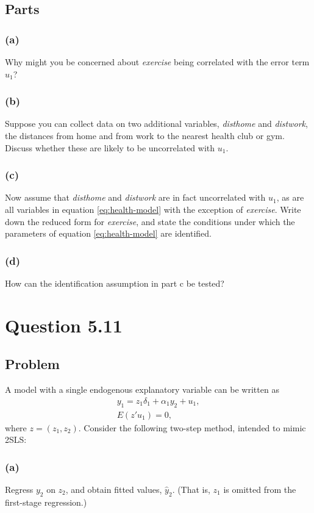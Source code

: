 \documentclass[10pt, a4paper]{article}
\begin{document}
  \subsection*{Parts}
    \subsubsection*{(a)}
      Why might you be concerned about \textit{exercise} being correlated with the error term $u_1$?
    \subsubsection*{(b)}
      Suppose you can collect data on two additional variables, \textit{disthome} and \textit{distwork}, the distances from home and from work to the nearest health club or gym. Discuss whether these are likely to be uncorrelated with $u_1$.
    \subsubsection*{(c)}
      Now assume that \textit{disthome} and \textit{distwork} are in fact uncorrelated with $u_1$, as are all variables in equation \eqref{eq:health-model} with the exception of \textit{exercise}. Write down the reduced form for \textit{exercise}, and state the conditions under which the parameters of equation \eqref{eq:health-model} are identified.
    \subsubsection*{(d)}
      How can the identification assumption in part c be tested?
\section*{Question 5.11}
  \subsection*{Problem}
    A model with a single endogenous explanatory variable can be written as
    \begin{gather}
      y_1 = z_1 \delta_1 + \alpha_1 y_2 + u_1, \\
      E(z'u_1) = 0,
    \end{gather}
    where $z = (z_1, z_2)$. Consider the following two-step method, intended to mimic 2SLS:
  \subsubsection*{(a)}
    Regress $y_2$ on $z_2$, and obtain fitted values, $\hat{y}_2$. (That is, $z_1$ is omitted from the first-stage regression.)
\end{document}
